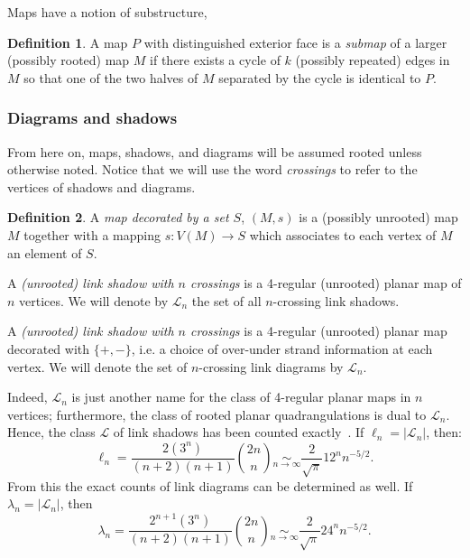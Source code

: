 \documentclass[amsmath,longbibliography,secnumarabic,floatfix,amssymb,nofootinbib,nobibnotes,letterpaper,11pt,tightenlines,notitlepage,showkeys,showlabels]{amsart}%
\newcommand{\LinkDia}{\mathcal{L}}
\newcommand{\linkdia}{\lambda}
\newcommand{\LinkShad}{\mathscr{L}}
\newcommand{\linkshad}{\ell}
\theoremstyle{definition}
\newtheorem*{definition}{Definition}
\begin{document}
Maps have a notion of substructure,

\begin{definition}
  A map $P$ with distinguished exterior face is a \emph{submap} of a
  larger (possibly rooted) map $M$ if there exists a cycle of $k$
  (possibly repeated) edges in $M$ so that one of the two halves of
  $M$ separated by the cycle is identical to $P$.
\end{definition}

\subsubsection{Diagrams and shadows}
\label{sec:shadowdefs}

From here on, maps, shadows, and diagrams will be assumed rooted
unless otherwise noted. Notice that we will use the word
\emph{crossings} to refer to the vertices of shadows and diagrams.

\begin{definition}
  A \emph{map decorated by a set $S$}, $(M, s)$ is a (possibly unrooted)
  map $M$ together with a mapping $s: V(M) \to S$ which associates to
  each vertex of $M$ an element of $S$.

  A \emph{(unrooted) link shadow with $n$ crossings} is a 4-regular
  (unrooted) planar map of $n$ vertices. We will denote by
  $\LinkShad_n$ the set of all $n$-crossing link shadows.

  A \emph{(unrooted) link shadow with $n$ crossings} is a 4-regular
  (unrooted) planar map decorated with $\{+,-\}$, i.e. a choice of
  over-under strand information at each vertex. We will denote the set
  of $n$-crossing link diagrams by $\LinkDia_n$.
\end{definition}

Indeed, $\LinkShad_n$ is just another name for the class of 4-regular
planar maps in $n$ vertices; furthermore, the class of rooted planar
quadrangulations is dual to $\LinkShad_n$.  Hence, the class
$\LinkShad$ of link shadows has been counted
exactly~\cite{chapman2011surveys}. If $\linkshad_n = |\LinkShad_n|$,
then:
\[ \linkshad_n = \frac{2(3^n)}{(n+2)(n+1)}\binom{2n}{n}
\mathop{\sim}\limits_{n \to \infty} \frac{2}{\sqrt\pi}12^nn^{-5/2}. \]
From this the exact counts of link diagrams can be determined
as well. If $\linkdia_n = |\LinkDia_n|$, then
\[ \linkdia_n = \frac{2^{n+1}(3^n)}{(n+2)(n+1)}\binom{2n}{n}
\mathop{\sim}\limits_{n \to \infty} \frac{2}{\sqrt\pi}24^nn^{-5/2}. \]
\end{document}
